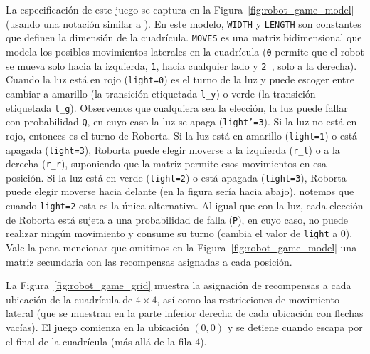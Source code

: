 La especificación de este juego se captura en la Figura~\ref{fig:robot_game_model} (usando una notación similar a {\Prism} \cite{DBLP:conf/cav/KwiatkowskaNP11}).
En este modelo, \texttt{WIDTH} y \texttt{LENGTH} son constantes que definen la dimensión de la cuadrícula. \texttt{MOVES} es una matriz bidimensional que modela los posibles movimientos laterales en la cuadrícula (\texttt{0} permite que el robot se mueva solo hacia la izquierda, \texttt{1}, hacia cualquier lado y \texttt{2 }, solo a la derecha). Cuando la luz está en rojo (\texttt{light=0}) es el turno de la luz y puede escoger entre cambiar a amarillo (la transición etiquetada \texttt{l\_y}) o verde (la transición etiquetada \texttt{l\_g}). Observemos que cualquiera sea la elección, la luz puede fallar con probabilidad \texttt{Q}, en cuyo caso la luz se apaga (\texttt{light’=3}). Si la luz no está en rojo, entonces es el turno de Roborta. Si la luz está en amarillo (\texttt{light=1}) o está apagada (\texttt{light=3}), Roborta puede elegir moverse a la izquierda (\texttt{r\_l}) o a la derecha (\texttt{r\_r}), suponiendo que la matriz permite esos movimientos en esa posición. Si la luz está en verde (\texttt{light=2}) o está apagada (\texttt{light=3}), Roborta puede elegir moverse hacia delante (en la figura sería hacia abajo), notemos que cuando \texttt{light=2} esta es la única alternativa. Al igual que con la luz, cada elección de Roborta está sujeta a una probabilidad de falla (\texttt{P}), en cuyo caso, no puede realizar ningún movimiento y consume su turno (cambia el valor de \texttt{light} a 0). Vale la pena mencionar que omitimos en la Figura~\ref{fig:robot_game_model} una matriz secundaria con las recompensas asignadas a cada posición.

La Figura~\ref{fig:robot_game_grid} muestra la asignación de recompensas a cada ubicación de la cuadrícula de $4 \times 4$, así como las restricciones de movimiento lateral (que se muestran en la parte inferior derecha de cada ubicación con flechas vacías).
El juego comienza en la ubicación $(0, 0)$ y se detiene cuando \roborta escapa por el final de la cuadrícula (más allá de la fila $4$).


